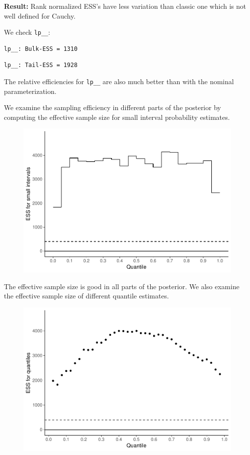 \documentclass[american,]{article}
\begin{document}
\textbf{Result:} Rank normalized ESS's have less variation than classic
one which is not well defined for Cauchy.

We check \texttt{lp\_\_}:

\begin{verbatim}
lp__: Bulk-ESS = 1310
\end{verbatim}

\begin{verbatim}
lp__: Tail-ESS = 1928
\end{verbatim}

The relative efficiencies for \texttt{lp\_\_} are also much better than
with the nominal parameterization.

We examine the sampling efficiency in different parts of the posterior
by computing the effective sample size for small interval probability
estimates.

\begin{figure}[t]
  \centering
  \includegraphics[width=0.6\linewidth]{graphics/local-ess-fit-alt1-2-1.pdf}
\end{figure}

The effective sample size is good in all parts of the posterior. We also
examine the effective sample size of different quantile estimates.

\begin{figure}[t]
  \centering
  \includegraphics[width=0.6\linewidth]{graphics/quantile-ess-fit-alt1-2-1.pdf}
\end{figure}
\end{document}
